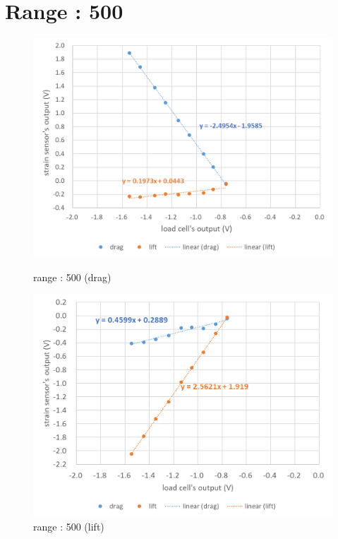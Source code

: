 \documentclass[a4paper]{jsarticle}
\begin{document}
\section{Range : 500}
\begin{figure}[htbp]
    \footnotesize
    \begin{center}
        \includegraphics[width=130mm]{../images/500_drag.png}
        \caption{range : 500 (drag)}
        \includegraphics[width=130mm]{../images/500_lift.png}
        \caption{range : 500 (lift)}
    \end{center}
\end{figure}
\newpage
\end{document}
